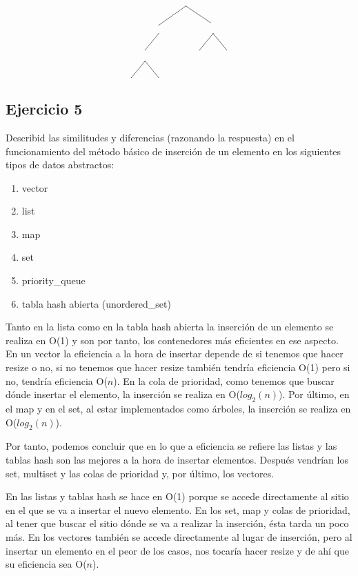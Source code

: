 \documentclass[10pt,a4paper,spanish]{report}
\begin{document}
\begin{description}
\[\begin{xy}
      \ar@{-} (0,-2);(-10,-9) %
      \ar@{-} (0,-2);(9,-8) %
      \ar@{-} (-10,-12);(-15,-18) %
      \ar@{-} (10,-12);(5,-18)
      \ar@{-} (10,-12);(15,-18)
      \ar@{-} (-15,-22);(-20,-28)
      \ar@{-} (-15,-22);(-10,-28)
      \end{xy}\]
\end{description}

\subsection{\textcolor[rgb]{0.5,0.8,1}Ejercicio 5}
\noindent
Describid las similitudes y diferencias (razonando la respuesta) en el funcionamiento del método básico de inserción de un elemento en los siguientes tipos de datos abstractos:
\begin{enumerate}[1)]
      \item vector
      \item list
      \item map
      \item set
      \item priority\_queue
      \item tabla hash abierta (unordered\_set)
\end{enumerate}

\noindent
Tanto en la lista como en la tabla hash abierta la inserción de un elemento se realiza en O(1) y son por tanto, los contenedores más eficientes en ese aspecto. En un vector la eficiencia a la hora de insertar depende de si tenemos que hacer resize o no, si no tenemos que hacer resize también tendría eficiencia O(1) pero si no, tendría eficiencia O($n$). En la cola de prioridad, como tenemos que buscar dónde insertar el elemento, la inserción se realiza en O($log_2 (n)$). Por último, en el map y en el set, al estar implementados como árboles, la inserción se realiza en O($log_2 (n)$). 

\noindent
Por tanto, podemos concluir que en lo que a eficiencia se refiere las listas y las tablas hash son las mejores a la hora de insertar elementos. Después vendrían los set, multiset y las colas de prioridad y, por último, los vectores.

\noindent
En las listas y tablas hash se hace en O(1) porque se accede directamente al sitio en el que se va a insertar el nuevo elemento. En los set, map y colas de prioridad, al tener que buscar el sitio dónde se va a realizar la inserción, ésta tarda un poco más. En los vectores también se accede directamente al lugar de inserción, pero al insertar un elemento en el peor de los casos, nos tocaría hacer resize y de ahí que su eficiencia sea O($n$).
\end{document}
